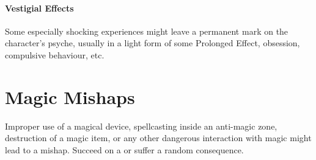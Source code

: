 \documentclass[itdr]{subfiles}
\begin{document}
\vfill

\paragraph{Vestigial Effects}
Some especially shocking experiences might leave a permanent mark on the character's psyche, usually in a light form of some Prolonged Effect, obsession, compulsive behaviour, etc.


\vfill
\break


\section{Magic Mishaps}

Improper use of a magical device, spellcasting inside an anti-magic zone, destruction of a magic item, or any other dangerous interaction with magic might lead to a mishap. Succeed on a  or suffer a random consequence.
\end{document}
